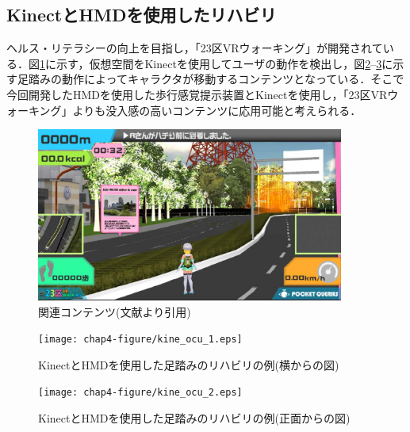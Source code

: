 \subsection{KinectとHMDを使用したリハビリ}
ヘルス・リテラシーの向上を目指し，「23区VRウォーキング」が開発されている．図\ref{fig:VR1}に示す，仮想空間をKinectを使用してユーザの動作を検出し，図\ref{fig:KHR-1}--\ref{fig:KHR-2}に示す足踏みの動作によってキャラクタが移動するコンテンツとなっている．そこで今回開発したHMDを使用した歩行感覚提示装置とKinectを使用し，「23区VRウォーキング」よりも没入感の高いコンテンツに応用可能と考えられる．

\begin{figure}[tbp]
	\centering
			\includegraphics[width=0.9\textwidth]{chap4-figure/VR1.eps}
	\caption{関連コンテンツ(文献\cite{VR}より引用)}
	\label{fig:VR1}
\end{figure}

\begin{figure}[tbp]
	\centering
			\texttt{[image: chap4-figure/kine\_ocu\_1.eps]}
	\caption{KinectとHMDを使用した足踏みのリハビリの例(横からの図)}
	\label{fig:KHR-1}
\end{figure}
\begin{figure}[tbp]
	\centering
			\texttt{[image: chap4-figure/kine\_ocu\_2.eps]}
	\caption{KinectとHMDを使用した足踏みのリハビリの例(正面からの図)}
	\label{fig:KHR-2}
\end{figure}


